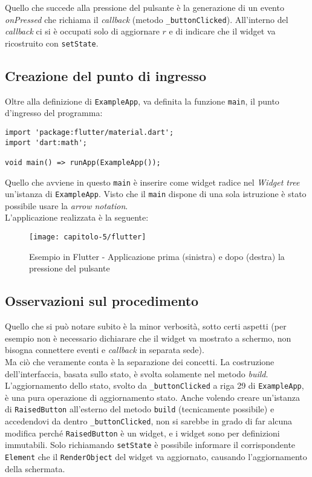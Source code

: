 Quello che succede alla pressione del pulsante è la generazione di un evento \emph{onPressed} che richiama il \emph{callback} (metodo \texttt{\_buttonClicked}). All'interno del \emph{callback} ci si è occupati solo di aggiornare $r$ e di indicare che il widget va ricostruito con \texttt{setState}.

\subsection{Creazione del punto di ingresso}
\label{subsec:creazione-main-qt}

Oltre alla definizione di \texttt{ExampleApp}, va definita la funzione \texttt{main}, il punto d'ingresso del programma:
\begin{lstlisting}
import 'package:flutter/material.dart';
import 'dart:math';

void main() => runApp(ExampleApp());
\end{lstlisting}
Quello che avviene in questo \texttt{main} è inserire come widget radice nel \emph{Widget tree} un'istanza di \texttt{ExampleApp}. Visto che il \texttt{main} dispone di una sola istruzione è stato possibile usare la \emph{arrow notation}.\\
L'applicazione realizzata è la seguente:
\begin{figure}[!h] 
  \centering 
  \texttt{[image: capitolo-5/flutter]} 
  \caption{Esempio in Flutter - Applicazione prima (sinistra) e dopo (destra) la pressione del pulsante}
\end{figure}

\subsection{Osservazioni sul procedimento}
\label{subsec:osservazioni-procedimento-qt}

Quello che si può notare subito è la minor verbosità, sotto certi aspetti (per esempio non è necessario dichiarare che il widget va mostrato a schermo, non bisogna connettere eventi e \emph{callback} in separata sede).\\
Ma ciò che veramente conta è la separazione dei concetti.
La costruzione dell'interfaccia, basata sullo stato, è svolta solamente nel metodo \emph{build}. L'aggiornamento dello stato, svolto da \texttt{\_buttonClicked} a riga 29 di \texttt{ExampleApp}, è una pura operazione di aggiornamento stato.
Anche volendo creare un'istanza di \texttt{RaisedButton} all'esterno del metodo \texttt{build} (tecnicamente possibile) e accedendovi da dentro \texttt{\_buttonClicked}, non si sarebbe in grado di far alcuna modifica perché \texttt{RaisedButton} è un widget, e i widget sono per definizioni immutabili.
Solo richiamando \texttt{setState} è possibile informare il corrispondente \texttt{Element} che il \texttt{RenderObject} del widget va aggiornato, causando l'aggiornamento della schermata.